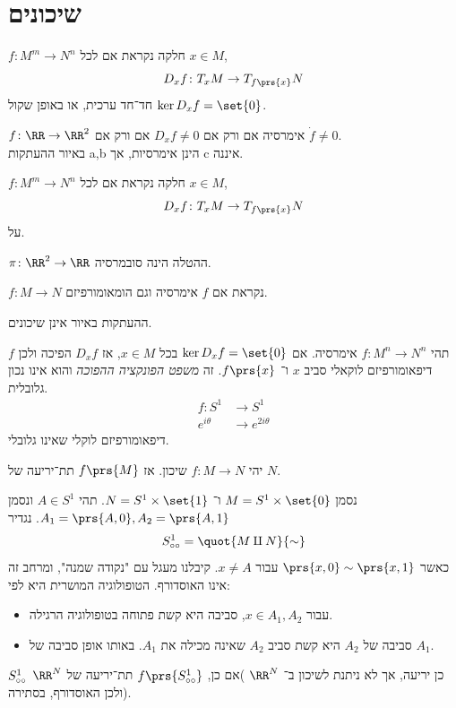 \documentclass[a4paper,10pt,twoside,openany]{book}
\begin{document}
\section{שיכונים}
\begin{definition}
$f \colon M^m \to N^n$
חלקה נקראת
אם לכל
$x \in M$,
\[D_x f \colon T_x M \to T_{f\prs{x}} N \]
חד־חד ערכית, או באופן שקול
$\ker D_x f = \set{0}$.
\end{definition}
\begin{example}
$f \colon \RR \to \RR^2$
אימרסיה אם ורק אם
$D_x f \neq 0$
אם ורק אם
$\dot{f} \neq 0$.\\
באיור
ההעתקות
\textenglish{a,b}
הינן אימרסיות, אך
\textenglish{c}
איננה.
\end{example}
\begin{definition}
$f \colon M^m \to N^n$
חלקה נקראת
אם לכל
$x \in M$,
\[D_x f \colon T_x M \to T_{f\prs{x}} N \]
על.
\end{definition}
\begin{example}
$\pi \colon \RR^2 \to \RR$
ההטלה הינה סובמרסיה.
\end{example}
\begin{definition}
$f \colon M \to N$
נקראת
אם
$f$
אימרסיה וגם הומאומורפיזם.
\end{definition}
\begin{example}
ההעתקות באיור
אינן שיכונים.
\end{example}
\begin{remark}
תהי
$f \colon M^n \to N^n$
אימרסיה.
אם
$\ker D_x f = \set{0}$
בכל
$x \in M$,
אז
$D_x f$
הפיכה ולכן
$f$
דיפאומורפיזם לוקאלי סביב
$x$
ו־%
$f\prs{x}$.
זה
\emph{משפט הפונקציה ההפוכה}
והוא אינו נכון גלובלית.
\begin{align*}
f \colon S^1 &\to S^1 \\
e^{i\theta} &\to e^{2i\theta}
\end{align*}
דיפאומורפיזם לוקלי שאינו גלובלי.
\end{remark}
\begin{exercise}[קשה]
יהי
$f \colon M \to N$
שיכון. אז
$f\prs{M}$
תת־יריעה של
$N$.
\end{exercise}
\begin{example}
נסמן
$M = S^1 \times \set{0}$
ו־%
$N = S^1 \times \set{1}$.
תהי
$A \in S^1$
ונסמן
$A_1 = \prs{A, 0}, A_2 = \prs{A, 1}$.
נגדיר
\begin{align*}
S^1_{\tiny{\circ \circ}} = \quot{M \amalg N}{\sim}
\end{align*}
כאשר
$\prs{x,0} \sim \prs{x,1}$
עבור
$x \neq A$.
קיבלנו מעגל עם "נקודה שמנה", ומרחב זה אינו האוסדורף.
הטופולוגיה המושרית היא לפי:
\begin{itemize}
\item עבור
$x \in A_1, A_2$,
סביבה היא קשת פתוחה בטופולוגיה הרגילה.
\item סביבה של
$A_2$
היא קשת סביב
$A_2$
שאינה מכילה את
$A_1$.
באותו אופן סביבה של
$A_1$.
\end{itemize}
$S^1_{\tiny{\circ \circ}}$
כן יריעה, אך לא ניתנת לשיכון ב־%
$\RR^N$
)אם כן,
$f\prs{S^1_{\tiny{\circ \circ}}}$
תת־יריעה של
$\RR^N$
ולכן האוסדורף, בסתירה).
\end{example}
\end{document}
